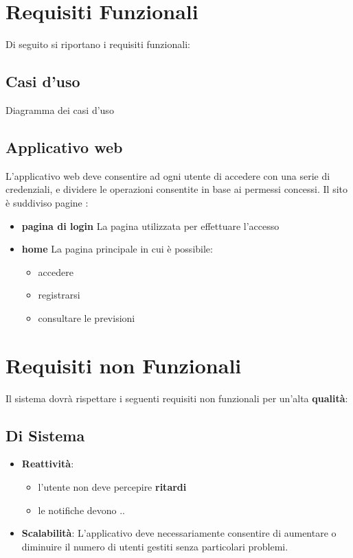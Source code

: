 	    
	\section{Requisiti Funzionali} %
	Di seguito si riportano i requisiti funzionali:
	    \subsection{Casi d'uso}
        	 Diagramma dei casi d'uso
                    
        \subsection{Applicativo web}
        L'applicativo web deve consentire ad ogni utente di accedere con una serie di credenziali, e dividere le operazioni consentite in base ai permessi concessi.
        Il sito è suddiviso pagine :
        \begin{itemize}
            \item \textbf{pagina di login}
                La pagina utilizzata per effettuare l'accesso
            \item \textbf{home}
                La pagina principale in cui è possibile:
                \begin{itemize}
                    \item accedere
                    \item registrarsi
                    \item consultare le previsioni
                \end{itemize}
            
        \end{itemize}
        
    
        
	\section{Requisiti non Funzionali}	
    Il sistema dovrà rispettare i seguenti requisiti non funzionali per un'alta \textbf{qualità}:
        \subsection{Di Sistema}
            \begin{itemize}
                \item \textbf{Reattività}: 
                    \begin{itemize}
                        \item l'utente non deve percepire \textbf{ritardi} 
                        \item le notifiche devono ..
                    \end{itemize}
                \item \textbf{Scalabilità}: L'applicativo deve necessariamente consentire di aumentare o diminuire il numero di utenti gestiti senza particolari problemi. 
            \end{itemize}
        

